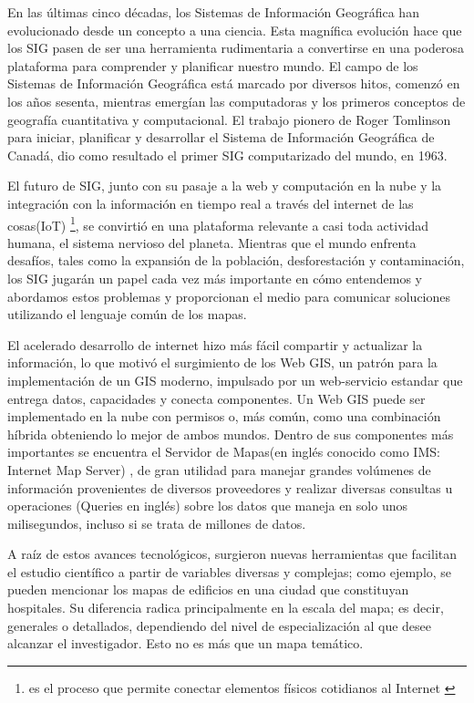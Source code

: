 En las \'ultimas cinco d\'ecadas, los Sistemas de Informaci\'on Geogr\'afica han evolucionado desde un concepto a una ciencia. Esta magn\'ifica evoluci\'on hace que los SIG pasen de ser una herramienta rudimentaria a convertirse en una poderosa
plataforma para comprender y planificar nuestro mundo. El campo de los Sistemas de Informaci\'on Geogr\'afica est\'a marcado por diversos hitos, comenz\'o en los a\~nos sesenta, mientras emerg\'ian las computadoras y los primeros conceptos de geograf\'ia cuantitativa y computacional. El trabajo pionero de Roger Tomlinson \cite{robert} para iniciar, planificar y desarrollar el Sistema de Informaci\'on Geogr\'afica de Canad\'a, dio como resultado el primer SIG computarizado del mundo, en 1963.

El futuro de SIG, junto con su pasaje a la web y computaci\'on en la nube y la integraci\'on con la informaci\'on en tiempo real a trav\'es del internet de las cosas(IoT) \footnote{es el proceso que permite conectar elementos f\'isicos cotidianos al Internet \cite{iot}}, se convirti\'o en una plataforma relevante a casi toda actividad humana, el sistema nervioso del planeta. Mientras que el mundo enfrenta desaf\'ios, tales como la expansi\'on de la poblaci\'on, desforestaci\'on y contaminaci\'on, los SIG \cite{FSIG} jugar\'an un papel cada vez m\'as importante en c\'omo entendemos y abordamos estos problemas y proporcionan el medio para comunicar soluciones utilizando el lenguaje com\'un de los mapas.

El acelerado desarrollo de internet hizo m\'as f\'acil compartir y actualizar la informaci\'on, lo que motiv\'o el surgimiento de los Web GIS, un patr\'on para la implementaci\'on de un GIS moderno, impulsado por un web-servicio estandar que entrega
datos, capacidades y conecta componentes. Un Web GIS puede ser implementado en la nube con permisos o, m\'as com\'un, como una combinaci\'on h\'ibrida obteniendo lo mejor de ambos mundos. Dentro de sus componentes m\'as importantes se encuentra el Servidor de Mapas(en ingl\'es conocido como IMS: Internet Map Server) \cite{webGis}, de gran utilidad para manejar grandes vol\'umenes de informaci\'on provenientes de diversos proveedores y realizar diversas consultas u operaciones (Queries en ingl\'es) sobre los datos que maneja en solo unos milisegundos, incluso si se trata de millones de datos.

A ra\'iz de estos avances tecnol\'ogicos, surgieron nuevas herramientas que facilitan el estudio cient\'ifico a partir de variables diversas y complejas; como ejemplo, se pueden mencionar los mapas de edificios en una ciudad que constituyan hospitales. Su diferencia radica principalmente en la escala del mapa; es decir, generales o detallados, dependiendo del nivel de especializaci\'on al que desee alcanzar el investigador. Esto no es m\'as que un mapa tem\'atico.

